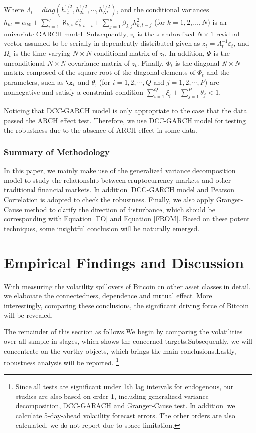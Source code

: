 \documentclass[review]{elsarticle}
\begin{document}
Where $\Lambda_t = diag(h_{1t}^{1/2}, h_{2t}^{1/2}, \cdots, h_{Nt}^{1/2})$, and the conditional variances $h_{kt} = \alpha_{k0} + \sum_{i=1}^q \aleph_{k,i} \varepsilon_{k,t-i}^2 + \sum_{j=1}^p \beta_{k,j} h_{k,t-j}^2$ (for $k = 1,2, \dots, N$) is an univariate GARCH model. Subsequently, $z_t$ is the standardized $N \times 1$ residual vector assumed to be serially in dependently distributed given as $z_t = \Lambda_t^{-1} \varepsilon_t$, and $\Omega_t$ is the time varying $N \times N$ conditional matrix of $z_t$. In addition, $\Psi$ is the unconditional $N \times N$ covariance matrix of $z_t$. Finally, $ \widetilde{\Phi}_t$ is the diagonal $N \times N$ matrix composed of the square root of the diagonal elements of $\Phi_t$ and the parameters, such as $\x_i$ and $\theta_j$ (for $i=1,2,\cdots,Q$ and $j=1,2,\cdots,P$) are nonnegative and satisfy a constraint condition $\sum_{i=1}^Q \xi_i + \sum_{j=1}^P \theta_j < 1$.

Noticing that DCC-GARCH model is only appropriate to the case that the data passed the ARCH effect test. Therefore, we use DCC-GARCH model for testing the robustness due to the absence of ARCH effect in some data.


\subsubsection{Summary of Methodology}
In this paper, we mainly make use of the generalized variance decomposition model to study the relationship between cruptocurrency markets and other traditional financial markets. In addition, DCC-GARCH model and Pearson Correlation is adopted to check the robustness. Finally, we also apply Granger-Cause method to clarify the direction of disturbance, which should be corresponding with Equation \ref{TO} and Equation \ref{FROM}. Based on these potent techniques, some insightful conclusion will be naturally emerged. 


\section{Empirical Findings and Discussion}
With measuring the volatility spillovers of Bitcoin on other asset classes in detail, we elaborate the connectedness, dependence and mutual effect. More interestingly, comparing these conclusions, the significant driving force of Bitcoin will be revealed.


The remainder of this section as follows.We begin by comparing the volatilities over all sample in stages, which shows the concerned targets.Subsequently, we will concentrate on the worthy objects, which brings the main conclusions.Lastly, robustness analysis will be reported. \footnote{Since all tests are significant under 1th lag intervals for endogenous, our studies are also based on order 1, including generalized variance decomposition, DCC-GARACH and Granger-Cause test. In addition, we calculate 5-day-ahead volatility forecast errors. The other orders are also calculated, we do not report due to space limitation.}
\end{document}
